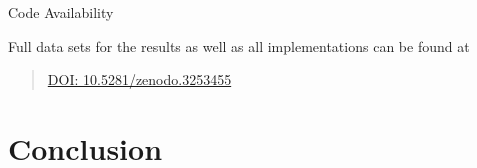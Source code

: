\begin{frame}{Code Availability}

Full data sets for the results as well as all implementations can be
found at

\begin{quote}
\href{https://doi.org/10.5281/zenodo.3253455}{DOI:
10.5281/zenodo.3253455}
\end{quote}

\end{frame}

\section{Conclusion}\label{conclusion}

